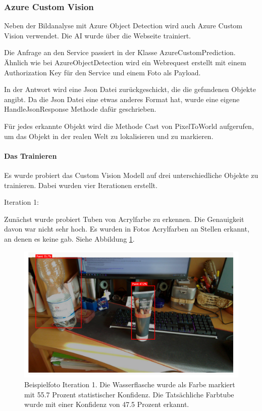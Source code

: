 \subsubsection{Azure Custom Vision}

Neben der Bildanalyse mit Azure Object Detection wird auch Azure Custom Vision verwendet.
Die AI wurde über die Webseite trainiert.

Die Anfrage an den Service passiert in der Klasse AzureCustomPrediction. Ähnlich wie bei AzureObjectDetection wird ein Webrequest erstellt mit einem Authorization Key für den Service und einem Foto als Payload.

In der Antwort wird eine Json Datei zurückgeschickt, die die gefundenen Objekte angibt.
Da die Json Datei eine etwas anderes Format hat, wurde eine eigene HandleJsonResponse Methode dafür geschrieben.

Für jedes erkannte Objekt wird die Methode Cast von PixelToWorld aufgerufen, um das Objekt in der realen Welt zu lokalisieren und zu markieren.

\paragraph{Das Trainieren}

Es wurde probiert das Custom Vision Modell auf drei unterschiedliche Objekte zu trainieren.
Dabei wurden vier Iterationen erstellt. 

Iteration 1:

Zunächst wurde probiert Tuben von Acrylfarbe zu erkennen. Die Genauigkeit davon war nicht sehr hoch. Es wurden in Fotos Acrylfarben an Stellen erkannt, an denen es keine gab. Siehe Abbildung \ref{image:customVisionPaint}. 

\begin{figure}[H]
	\centering
	\includegraphics[width=1.0\textwidth]{images/customVisionPaint.PNG}
	\caption[]{Beispielfoto Iteration 1. Die Wasserflasche wurde als Farbe markiert mit 55.7 Prozent statistischer Konfidenz. Die Tatsächliche Farbtube wurde mit einer Konfidenz von 47.5 Prozent erkannt.}
	\label{image:customVisionPaint}
\end{figure}


